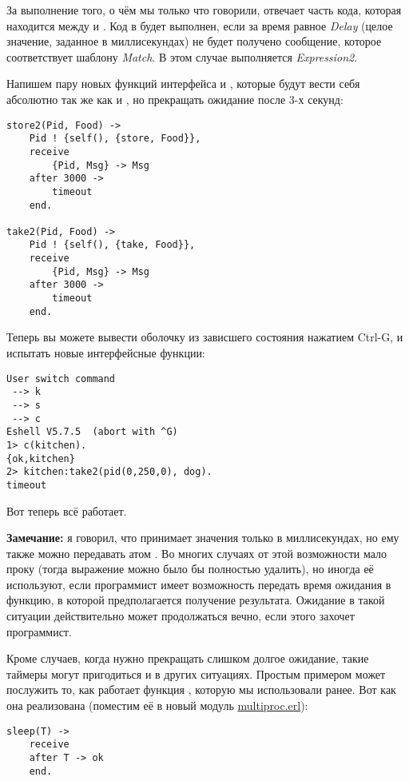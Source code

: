 За выполнение того, о чём мы только что говорили, отвечает часть кода, которая находится между  и .
Код в  будет выполнен, если за время равное \emph{Delay} (целое значение, заданное в миллисекундах) не будет получено сообщение, которое соответствует шаблону \emph{Match}.
В этом случае выполняется \emph{Expression2}.

Напишем пару новых функций интерфейса  и , которые будут вести себя абсолютно так же как  и , но прекращать ожидание после 3\--х секунд:
\begin{lstlisting}[style=erlang]
store2(Pid, Food) ->
    Pid ! {self(), {store, Food}},
    receive
        {Pid, Msg} -> Msg
    after 3000 ->
        timeout
    end.
 
take2(Pid, Food) ->
    Pid ! {self(), {take, Food}},
    receive
        {Pid, Msg} -> Msg
    after 3000 ->
        timeout
    end.
\end{lstlisting}

Теперь вы можете вывести оболочку из зависшего состояния нажатием Ctrl-G, и испытать новые интерфейсные функции:
\begin{lstlisting}[style=erlang]
User switch command
 --> k
 --> s
 --> c
Eshell V5.7.5  (abort with ^G)
1> c(kitchen).
{ok,kitchen}
2> kitchen:take2(pid(0,250,0), dog).
timeout
\end{lstlisting}

Вот теперь всё работает.\\
\colorbox{lgray}
{
\begin{minipage}{1.0\linewidth}
    \textbf{Замечание:} я говорил, что  принимает значения только в миллисекундах, но ему также можно передавать атом .
    Во многих случаях от этой возможности мало проку (тогда выражение  можно было бы полностью удалить), но иногда её используют, если программист имеет возможность передать время ожидания в функцию, в которой предполагается получение результата.
    Ожидание в такой ситуации действительно может продолжаться вечно, если этого захочет программист.
\end{minipage}
}

Кроме случаев, когда нужно прекращать слишком долгое ожидание, такие таймеры могут пригодиться и в других ситуациях.
Простым примером может послужить то, как работает функция , которую мы использовали ранее.
Вот как она реализована (поместим её в новый модуль \href{http://learnyousomeerlang.com/static/erlang/multiproc.erl}{multiproc.erl}):
\begin{lstlisting}[style=erlang]
sleep(T) ->
    receive
    after T -> ok
    end.
\end{lstlisting}

